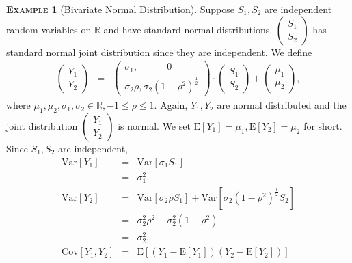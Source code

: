 \documentclass[a4paper, twoside, 11pt]{article}
\theoremstyle{definition}
\newtheorem{example}[definition]{\scshape Example}
\begin{document}
\begin{example}[Bivariate Normal Distribution]
  Suppose $S_1, S_2$ are independent random variables on $\mathbb{R}$ and have standard normal distributions. $\left(
    \begin{array}{c}
      S_1 \\
      S_2
    \end{array}
  \right)$  has standard normal joint distribution since they are independent. We define
  \begin{eqnarray}
	\left(
    \begin{array}{c}
      Y_1 \\
      Y_2
    \end{array}
	\right)
	&=& 
	\left(
    \begin{array}{l}
	  \sigma_1,\hspace{3em} 0 \\
	  \sigma_2 \rho, \sigma_2(1-\rho^2)^{\frac{1}{2}}
    \end{array}
  \right) \cdot
	\left(
    \begin{array}{c}
      S_1 \\
      S_2
    \end{array}
  \right)  +
  \left(
    \begin{array}{c}
      \mu_1 \\
      \mu_2
    \end{array}
  \right)
  \label{sec:bi},
  \end{eqnarray}
  where $\mu_1, \mu_2, \sigma_1, \sigma_2 \in \mathbb{R}, -1 \le \rho \le 1$. Again, $Y_1, Y_2$ are normal distributed and the joint distribution  $\left(
    \begin{array}{c}
      Y_1 \\
      Y_2
    \end{array}
	\right)$ is normal. We set $\mathrm{E}[Y_1] = \mu_1, \mathrm{E}[Y_2] = \mu_2 $ for short. Since $S_1, S_2$ are independent,
	\begin{eqnarray*}
	  \mathrm{Var}[Y_1] &=& \mathrm{Var}[\sigma_1 S_1]\\
						 &=& \sigma_1^2 ,\\
						 \mathrm{Var}[Y_2] &=& \mathrm{Var}[\sigma_2\rho S_1] + \mathrm{Var}[\sigma_2 (1-\rho^2)^{\frac{1}{2}} S_2]\\
						 &=& \sigma_2^2 \rho^2 + \sigma_2^2(1 - \rho^2)\\
						 &=& \sigma_2^2,\\
						 \mathrm{Cov}[Y_1, Y_2] &=& \mathrm{E}[(Y_1 - \mathrm{E}[Y_1])(Y_2 - \mathrm{E}[Y_2])]\\

\end{eqnarray*}
\end{example}
\end{document}
